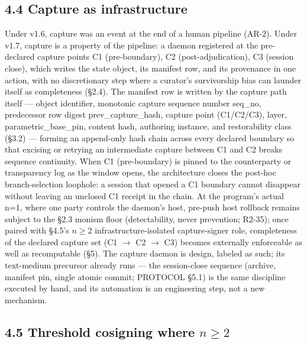 \documentclass[11pt]{article}
\begin{document}
\subsection{4.4 Capture as infrastructure}\label{capture-as-infrastructure}

Under v1.6, capture was an event at the end of a human pipeline (AR-2). Under v1.7, capture is a property of the pipeline: a daemon registered at the pre-declared capture points C1 (pre-boundary), C2 (post-adjudication), C3 (session close), which writes the state object, its manifest row, and its provenance in one action, with no discretionary step where a curator's survivorship bias can launder itself as completeness (\S{}2.4). The manifest row is written by the capture path itself --- object identifier, monotonic capture sequence number seq\_no, predecessor row digest prev\_capture\_hash, capture point (C1/C2/C3), layer, parametric\_base\_pin, content hash, authoring instance, and restorability class (\S{}3.2) --- forming an append-only hash chain across every declared boundary so that excising or retrying an intermediate capture between C1 and C2 breaks sequence continuity. When C1 (pre-boundary) is pinned to the counterparty or transparency log as the window opens, the architecture closes the post-hoc branch-selection loophole: a session that opened a C1 boundary cannot disappear without leaving an unclosed C1 receipt in the chain. At the program's actual n=1, where one party controls the daemon's host, pre-push host rollback remains subject to the \S{}2.3 monism floor (detectability, never prevention; R2-35); once paired with \S{}4.5's \(n\geq 2\) infrastructure-isolated capture-signer role, completeness of the declared capture set (C1 \(\to\) C2 \(\to\) C3) becomes externally enforceable as well as recomputable (\S{}5). The capture daemon is design, labeled as such; its text-medium precursor already runs --- the session-close sequence (archive, manifest pin, single atomic commit; PROTOCOL \S{}5.1) is the same discipline executed by hand, and its automation is an engineering step, not a new mechanism.

\subsection{\texorpdfstring{4.5 Threshold cosigning where \(n\geq 2\)}{4.5 Threshold cosigning where n\textbackslash geq 2}}\label{threshold-cosigning-where-ngeq-2}
\end{document}
